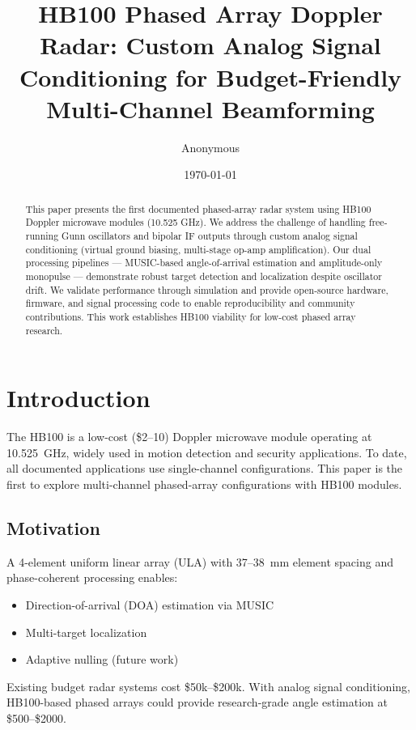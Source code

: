 \documentclass[10pt,a4paper]{article}
\title{HB100 Phased Array Doppler Radar: Custom Analog Signal Conditioning for Budget-Friendly Multi-Channel Beamforming}
\author{Anonymous}
\date{\today}
\begin{document}
\maketitle

\begin{abstract}
This paper presents the first documented phased-array radar system using HB100 Doppler microwave modules (10.525 GHz).
We address the challenge of handling free-running Gunn oscillators and bipolar IF outputs through custom analog signal conditioning
(virtual ground biasing, multi-stage op-amp amplification). Our dual processing pipelines --- MUSIC-based angle-of-arrival estimation
and amplitude-only monopulse --- demonstrate robust target detection and localization despite oscillator drift.
We validate performance through simulation and provide open-source hardware, firmware, and signal processing code
to enable reproducibility and community contributions. This work establishes HB100 viability for low-cost phased array research.
\end{abstract}

\section{Introduction}
\label{sec:intro}

The HB100 is a low-cost (\$2--10) Doppler microwave module operating at 10.525~GHz,
widely used in motion detection and security applications. To date, all documented
applications use single-channel configurations. This paper is the first to explore
multi-channel phased-array configurations with HB100 modules.

\subsection{Motivation}

A 4-element uniform linear array (ULA) with 37--38~mm element spacing and phase-coherent
processing enables:
\begin{itemize}
\item Direction-of-arrival (DOA) estimation via MUSIC
\item Multi-target localization
\item Adaptive nulling (future work)
\end{itemize}

Existing budget radar systems cost \$50k--\$200k. With analog signal conditioning,
HB100-based phased arrays could provide research-grade angle estimation at \$500--\$2000.
\end{document}
